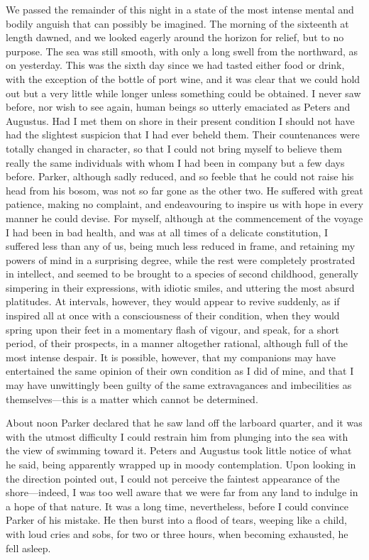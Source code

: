 We passed the remainder of this night in a state of the most intense mental
and bodily anguish that can possibly be imagined. The morning of the sixteenth
at length dawned, and we looked eagerly around the horizon for relief, but to no
purpose. The sea was still smooth, with only a long swell from the northward, as
on yesterday. This was the sixth day since we had tasted either food or drink,
with the exception of the bottle of port wine, and it was clear that we could
hold out but a very little while longer unless something could be obtained. I
never saw before, nor wish to see again, human beings so utterly emaciated as
Peters and Augustus. Had I met them on shore in their present condition I should
not have had the slightest suspicion that I had ever beheld them. Their
countenances were totally changed in character, so that I could not bring myself
to believe them really the same individuals with whom I had been in company but
a few days before. Parker, although sadly reduced, and so feeble that he could
not raise his head from his bosom, was not so far gone as the other two. He
suffered with great patience, making no complaint, and endeavouring to inspire
us with hope in every manner he could devise. For myself, although at the
commencement of the voyage I had been in bad health, and was at all times of a
delicate constitution, I suffered less than any of us, being much less reduced
in frame, and retaining my powers of mind in a surprising degree, while the rest
were completely prostrated in intellect, and seemed to be brought to a species
of second childhood, generally simpering in their expressions, with idiotic
smiles, and uttering the most absurd platitudes. At intervals, however, they
would appear to revive suddenly, as if inspired all at once with a consciousness
of their condition, when they would spring upon their feet in a momentary flash
of vigour, and speak, for a short period, of their prospects, in a manner
altogether rational, although full of the most intense despair. It is possible,
however, that my companions may have entertained the same opinion of their own
condition as I did of mine, and that I may have unwittingly been guilty of the
same extravagances and imbecilities as themselves---this is a matter which
cannot be determined. 

About noon Parker declared that he saw land off the larboard quarter, and it
was with the utmost difficulty I could restrain him from plunging into the sea
with the view of swimming toward it. Peters and Augustus took little notice of
what he said, being apparently wrapped up in moody contemplation. Upon looking
in the direction pointed out, I could not perceive the faintest appearance of
the shore---indeed, I was too well aware that we were far from any land to
indulge in a hope of that nature. It was a long time, nevertheless, before I
could convince Parker of his mistake. He then burst into a flood of tears,
weeping like a child, with loud cries and sobs, for two or three hours, when
becoming exhausted, he fell asleep. 

